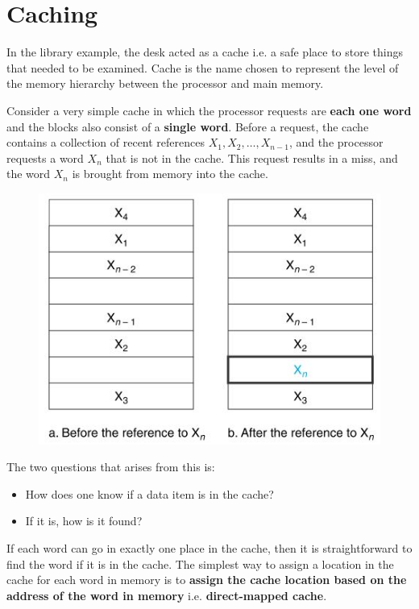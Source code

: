 \documentclass[10pt,a4paper]{article}
\begin{document}
\pagebreak

\section{Caching}

In the library example, the desk acted as a cache i.e. a safe place to store things that needed to
be examined. Cache is the name chosen to represent the level of the memory hierarchy between the
processor and main memory.

Consider a very simple cache in which the processor requests are \textbf{each one word} and the
blocks also consist of a \textbf{single word}. Before a request, the cache contains a collection of recent references $X_1, X_2,\dots, X_{n-1}$, and the processor requests a word $X_n$ that is not in the cache. This 
request results in a miss, and the word $X_n$ is brought from memory into the cache. 
\begin{figure} [h!]
    \centering
    \includegraphics[scale=0.7]{Cache.JPG}
\end{figure}

The two questions that arises from this is: 
\begin{itemize}
    \item How does one know if a data item is in the cache?
    \item If it is, how is it found?
\end{itemize} 

If each word can go in exactly one place in the cache, then it is straightforward to find the word
if it is in the cache. The simplest way to assign a location in the cache for each word in memory is
to \textbf{assign the cache location based on the address of the word in memory} i.e.
\textbf{direct-mapped cache}.
\end{document}
